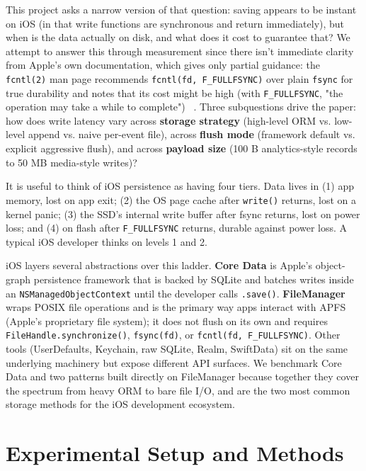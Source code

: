 This project asks a narrow version of that question: saving appears to be instant on iOS (in that write functions are synchronous and return immediately), but when is the data actually on disk, and what does it cost to guarantee that? We attempt to answer this through measurement since there isn't immediate clarity from Apple's own documentation, which gives only partial guidance: the \verb|fcntl(2)| man page recommends \verb|fcntl(fd, F_FULLFSYNC)| over plain \verb|fsync| for true durability and notes that its cost might be high (with \verb|F_FULLFSYNC|, "the operation may take a while to complete") ~\cite{appleFcntl}. Three subquestions drive the paper: how does write latency vary across \textbf{storage strategy} (high-level ORM vs. low-level append vs. naive per-event file), across \textbf{flush mode} (framework default vs. explicit aggressive flush), and across \textbf{payload size} (100 B analytics-style records to 50 MB media-style writes)?

It is useful to think of iOS persistence as having four tiers. Data lives in (1) app memory, lost on app exit; (2) the OS page cache after \verb|write()| returns, lost on a kernel panic; (3) the SSD's internal write buffer after fsync returns, lost on power loss; and (4) on flash after \verb|F_FULLFSYNC| returns, durable against power loss. A typical iOS developer thinks on levels 1 and 2.

iOS layers several abstractions over this ladder. \textbf{Core Data} is Apple's object-graph persistence framework that is backed by SQLite and batches writes inside an \verb|NSManagedObjectContext| until the developer calls \verb|.save()|. \textbf{FileManager} wraps POSIX file operations and is the primary way apps interact with APFS (Apple's proprietary file system); it does not flush on its own and requires \verb|FileHandle.synchronize()|, \verb|fsync(fd)|, or \verb|fcntl(fd, F_FULLFSYNC)|. Other tools (UserDefaults, Keychain, raw SQLite, Realm, SwiftData) sit on the same underlying machinery but expose different API surfaces. We benchmark Core Data and two patterns built directly on FileManager because together they cover the spectrum from heavy ORM to bare file I/O, and are the two most common storage methods for the iOS development ecosystem.

\section{Experimental Setup and Methods}

